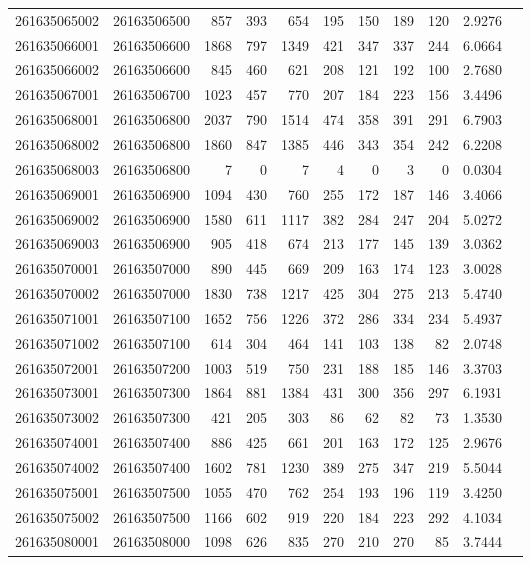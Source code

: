 \documentclass[11pt,landscape]{article}
\begin{document}
{\begin{longtable}[]{@{}lrrrrrrrrrr@{}}
261635065002 & 26163506500 & 857 & 393 & 654 & 195 & 150 & 189 & 120 & 2.9276 \\
261635066001 & 26163506600 & 1868 & 797 & 1349 & 421 & 347 & 337 & 244 & 6.0664 \\
261635066002 & 26163506600 & 845 & 460 & 621 & 208 & 121 & 192 & 100 & 2.7680 \\
261635067001 & 26163506700 & 1023 & 457 & 770 & 207 & 184 & 223 & 156 & 3.4496 \\
261635068001 & 26163506800 & 2037 & 790 & 1514 & 474 & 358 & 391 & 291 & 6.7903 \\
261635068002 & 26163506800 & 1860 & 847 & 1385 & 446 & 343 & 354 & 242 & 6.2208 \\
261635068003 & 26163506800 & 7 & 0 & 7 & 4 & 0 & 3 & 0 & 0.0304 \\
261635069001 & 26163506900 & 1094 & 430 & 760 & 255 & 172 & 187 & 146 & 3.4066 \\
261635069002 & 26163506900 & 1580 & 611 & 1117 & 382 & 284 & 247 & 204 & 5.0272 \\
261635069003 & 26163506900 & 905 & 418 & 674 & 213 & 177 & 145 & 139 & 3.0362 \\
261635070001 & 26163507000 & 890 & 445 & 669 & 209 & 163 & 174 & 123 & 3.0028 \\
261635070002 & 26163507000 & 1830 & 738 & 1217 & 425 & 304 & 275 & 213 & 5.4740 \\
261635071001 & 26163507100 & 1652 & 756 & 1226 & 372 & 286 & 334 & 234 & 5.4937 \\
261635071002 & 26163507100 & 614 & 304 & 464 & 141 & 103 & 138 & 82 & 2.0748 \\
261635072001 & 26163507200 & 1003 & 519 & 750 & 231 & 188 & 185 & 146 & 3.3703 \\
261635073001 & 26163507300 & 1864 & 881 & 1384 & 431 & 300 & 356 & 297 & 6.1931 \\
261635073002 & 26163507300 & 421 & 205 & 303 & 86 & 62 & 82 & 73 & 1.3530 \\
261635074001 & 26163507400 & 886 & 425 & 661 & 201 & 163 & 172 & 125 & 2.9676 \\
261635074002 & 26163507400 & 1602 & 781 & 1230 & 389 & 275 & 347 & 219 & 5.5044 \\
261635075001 & 26163507500 & 1055 & 470 & 762 & 254 & 193 & 196 & 119 & 3.4250 \\
261635075002 & 26163507500 & 1166 & 602 & 919 & 220 & 184 & 223 & 292 & 4.1034 \\
261635080001 & 26163508000 & 1098 & 626 & 835 & 270 & 210 & 270 & 85 & 3.7444 \\

\end{longtable}}
\end{document}
